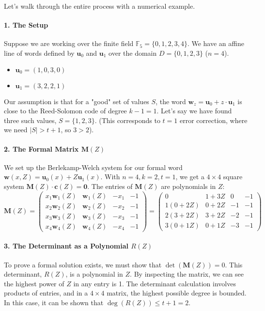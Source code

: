 \documentclass{article}
\begin{document}
\begin{tcolorbox}[breakable, title={Full Example: Proving a Formal Solution Exists}]
Let's walk through the entire process with a numerical example.

\paragraph{1. The Setup}
Suppose we are working over the finite field $\mathbb{F}_5 = \{0,1,2,3,4\}$. We have an affine line of words defined by $\mathbf{u}_0$ and $\mathbf{u}_1$ over the domain $D=\{0,1,2,3\}$ ($n=4$).
\begin{itemize}
    \item $\mathbf{u}_0 = (1, 0, 3, 0)$
    \item $\mathbf{u}_1 = (3, 2, 2, 1)$
\end{itemize}
Our assumption is that for a "good" set of values $S$, the word $\mathbf{w}_z = \mathbf{u}_0 + z \cdot \mathbf{u}_1$ is close to the Reed-Solomon code of degree $k-1=1$. Let's say we have found three such values, $S=\{1,2,3\}$. (This corresponds to $t=1$ error correction, where we need $|S| > t+1$, so $3 > 2$).

\paragraph{2. The Formal Matrix $\mathbf{M}(Z)$}
We set up the Berlekamp-Welch system for our formal word $\mathbf{w}(x,Z) = \mathbf{u}_0(x) + Z\mathbf{u}_1(x)$. With $n=4, k=2, t=1$, we get a $4 \times 4$ square system $\mathbf{M}(Z)\cdot\mathbf{c}(Z) = \mathbf{0}$. The entries of $\mathbf{M}(Z)$ are polynomials in $Z$:
\[
\mathbf{M}(Z) = 
\begin{pmatrix}
x_1 \mathbf{w}_1(Z) & \mathbf{w}_1(Z) & -x_1 & -1 \\
x_2 \mathbf{w}_2(Z) & \mathbf{w}_2(Z) & -x_2 & -1 \\
x_3 \mathbf{w}_3(Z) & \mathbf{w}_3(Z) & -x_3 & -1 \\
x_4 \mathbf{w}_4(Z) & \mathbf{w}_4(Z) & -x_4 & -1
\end{pmatrix}
=
\begin{pmatrix}
0 & 1+3Z & 0 & -1 \\
1(0+2Z) & 0+2Z & -1 & -1 \\
2(3+2Z) & 3+2Z & -2 & -1 \\
3(0+1Z) & 0+1Z & -3 & -1
\end{pmatrix}
\]

\paragraph{3. The Determinant as a Polynomial $R(Z)$}
To prove a formal solution exists, we must show that $\det(\mathbf{M}(Z)) = 0$. This determinant, $R(Z)$, is a polynomial in $Z$. By inspecting the matrix, we can see the highest power of $Z$ in any entry is 1. The determinant calculation involves products of entries, and in a $4 \times 4$ matrix, the highest possible degree is bounded. In this case, it can be shown that $\deg(R(Z)) \le t+1 = 2$.


\end{tcolorbox}
\end{document}
